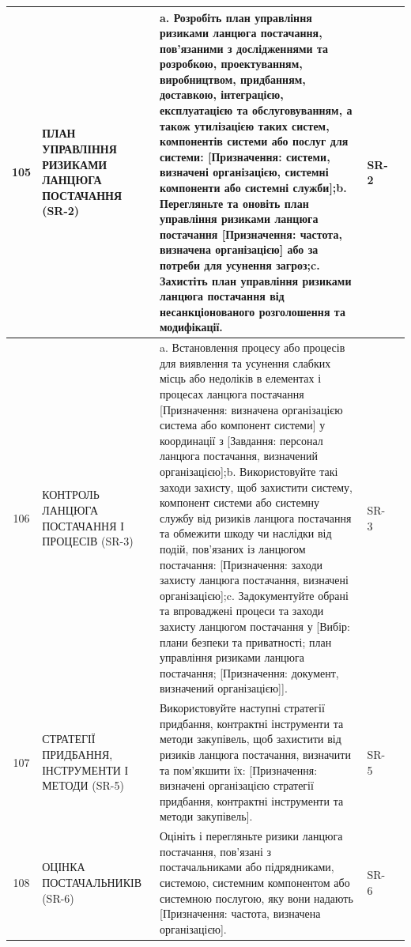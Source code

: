 \documentclass[10pt]{article}
\begin{document}
\begin{longtable}{|c|>{\raggedright\arraybackslash}p{4cm}|>{\raggedright\arraybackslash}p{6cm}|>{\raggedright\arraybackslash}p{1.5cm}|>{\raggedright\arraybackslash}p{3.5cm}|}
105 & ПЛАН УПРАВЛІННЯ РИЗИКАМИ ЛАНЦЮГА ПОСТАЧАННЯ (SR-2) & a. Розробіть план управління ризиками ланцюга постачання, пов'язаними з дослідженнями та розробкою, проектуванням, виробництвом, придбанням, доставкою, інтеграцією, експлуатацією та обслуговуванням, а також утилізацією таких систем, компонентів системи або послуг для системи: [Призначення: системи, визначені організацією, системні компоненти або системні служби];\newline b. Перегляньте та оновіть план управління ризиками ланцюга постачання [Призначення: частота, визначена організацією] або за потреби для усунення загроз;\newline c. Захистіть план управління ризиками ланцюга постачання від несанкціонованого розголошення та модифікації. & SR-2 & \\ \hline
106 & КОНТРОЛЬ ЛАНЦЮГА ПОСТАЧАННЯ І ПРОЦЕСІВ (SR-3) & a. Встановлення процесу або процесів для виявлення та усунення слабких місць або недоліків в елементах і процесах ланцюга постачання [Призначення: визначена організацією система або компонент системи] у координації з [Завдання: персонал ланцюга постачання, визначений організацією];\newline b. Використовуйте такі заходи захисту, щоб захистити систему, компонент системи або системну службу від ризиків ланцюга постачання та обмежити шкоду чи наслідки від подій, пов'язаних із ланцюгом постачання: [Призначення: заходи захисту ланцюга постачання, визначені організацією];\newline c. Задокументуйте обрані та впроваджені процеси та заходи захисту ланцюгом постачання у [Вибір: плани безпеки та приватності; план управління ризиками ланцюга постачання; [Призначення: документ, визначений організацією]]. & SR-3 & \\ \hline
107 & СТРАТЕГІЇ ПРИДБАННЯ, ІНСТРУМЕНТИ І МЕТОДИ (SR-5) & Використовуйте наступні стратегії придбання, контрактні інструменти та методи закупівель, щоб захистити від ризиків ланцюга постачання, визначити та пом'якшити їх: [Призначення: визначені організацією стратегії придбання, контрактні інструменти та методи закупівель]. & SR-5 & \\ \hline
108 & ОЦІНКА ПОСТАЧАЛЬНИКІВ (SR-6) & Оцініть і перегляньте ризики ланцюга постачання, пов'язані з постачальниками або підрядниками, системою, системним компонентом або системною послугою, яку вони надають [Призначення: частота, визначена організацією]. & SR-6 & \\ \hline


\end{longtable}
\end{document}

